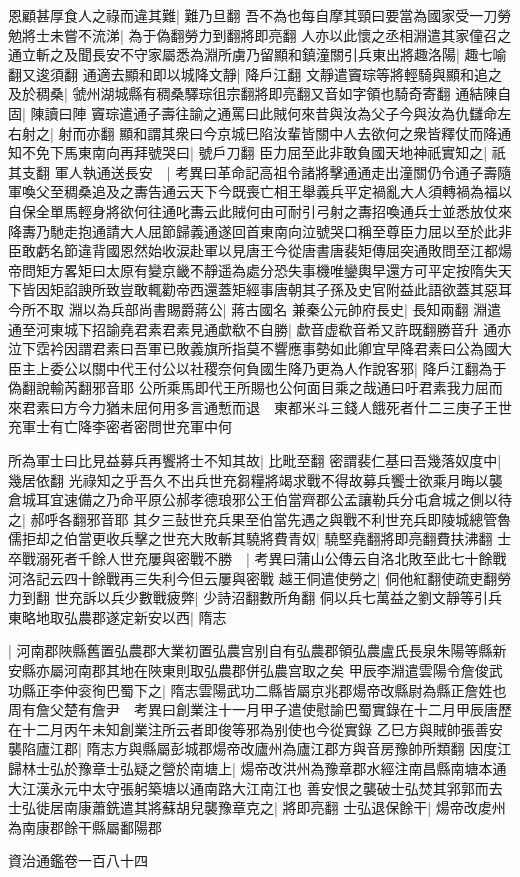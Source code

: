 恩顧甚厚食人之祿而違其難|{
	難乃旦翻}
吾不為也每自摩其頸曰要當為國家受一刀勞勉將士未嘗不流涕|{
	為于偽翻勞力到翻將即亮翻}
人亦以此懷之丞相淵遣其家僮召之通立斬之及聞長安不守家屬悉為淵所虜乃留顯和鎮潼關引兵東出將趣洛陽|{
	趣七喻翻又逡須翻}
通適去顯和即以城降文靜|{
	降戶江翻}
文靜遣竇琮等將輕騎與顯和追之及於稠桑|{
	虢州湖城縣有稠桑驛琮徂宗翻將即亮翻又音如字領也騎奇寄翻}
通結陳自固|{
	陳讀曰陣}
竇琮遣通子壽往諭之通罵曰此賊何來昔與汝為父子今與汝為仇讎命左右射之|{
	射而亦翻}
顯和謂其衆曰今京城巳陷汝輩皆關中人去欲何之衆皆釋仗而降通知不免下馬東南向再拜號哭曰|{
	號戶刀翻}
臣力屈至此非敢負國天地神祇實知之|{
	祇其支翻}
軍人執通送長安　|{
	考異曰革命記高祖令諸將擊通通走出潼關仍令通子壽隨軍喚父至稠桑追及之夀告通云天下今既喪亡相王舉義兵平定禍亂大人須轉禍為福以自保全單馬輕身將欲何往通叱夀云此賊何由可耐引弓射之夀招喚通兵士並悉放仗來降夀乃馳走抱通請大人屈節歸義通遂回首東南向泣號哭口稱至尊臣力屈以至於此非臣敢虧名節違背國恩然始收涙赴軍以見唐王今從唐書唐裴矩傳屈突通敗問至江都煬帝問矩方畧矩曰太原有變京畿不靜遥為處分恐失事機唯鑾輿早還方可平定按隋失天下皆因矩諂諛所致豈敢輒勸帝西還蓋矩經事唐朝其子孫及史官附益此語欲蓋其惡耳今所不取}
淵以為兵部尚書賜爵蔣公|{
	蔣古國名}
兼秦公元帥府長史|{
	長知兩翻}
淵遣通至河東城下招諭堯君素君素見通歔欷不自勝|{
	歔音虚欷音希又許既翻勝音升}
通亦泣下霑衿因謂君素曰吾軍已敗義旗所指莫不響應事勢如此卿宜早降君素曰公為國大臣主上委公以關中代王付公以社稷奈何負國生降乃更為人作說客邪|{
	降戶江翻為于偽翻說輸芮翻邪音耶}
公所乘馬即代王所賜也公何面目乘之哉通曰吁君素我力屈而來君素曰方今力猶未屈何用多言通慙而退　東都米斗三錢人餓死者什二三庚子王世充軍士有亡降李密者密問世充軍中何

所為軍士曰比見益募兵再饗將士不知其故|{
	比毗至翻}
密謂裴仁基曰吾幾落奴度中|{
	幾居依翻}
光祿知之乎吾久不出兵世充芻糧將竭求戰不得故募兵饗士欲乘月晦以襲倉城耳宜速備之乃命平原公郝孝德琅邪公王伯當齊郡公孟讓勒兵分屯倉城之側以待之|{
	郝呼各翻邪音耶}
其夕三鼔世充兵果至伯當先遇之與戰不利世充兵即陵城總管魯儒拒却之伯當更收兵擊之世充大敗斬其驍將費青奴|{
	驍堅堯翻將即亮翻費扶沸翻}
士卒戰溺死者千餘人世充屢與密戰不勝　|{
	考異曰蒲山公傳云自洛北敗至此七十餘戰河洛記云四十餘戰再三失利今但云屢與密戰}
越王侗遣使勞之|{
	侗他紅翻使疏吏翻勞力到翻}
世充訴以兵少數戰疲弊|{
	少詩沼翻數所角翻}
侗以兵七萬益之劉文靜等引兵東略地取弘農郡遂定新安以西|{
	隋志}


|{
	河南郡陜縣舊置弘農郡大業初置弘農宫别自有弘農郡領弘農盧氏長泉朱陽等縣新安縣亦屬河南郡其地在陜東則取弘農郡併弘農宫取之矣}
甲辰李淵遣雲陽令詹俊武功縣正李仲衮徇巴蜀下之|{
	隋志雲陽武功二縣皆屬京兆郡煬帝改縣尉為縣正詹姓也周有詹父楚有詹尹　考異曰創業注十一月甲子遣使慰諭巴蜀實錄在十二月甲辰唐歷在十二月丙午未知創業注所云者即俊等邪為别使也今從實錄}
乙巳方與賊帥張善安襲陷廬江郡|{
	隋志方與縣屬彭城郡煬帝改廬州為廬江郡方與音房豫帥所類翻}
因度江歸林士弘於豫章士弘疑之營於南塘上|{
	煬帝改洪州為豫章郡水經注南昌縣南塘本通大江漢永元中太守張躬築塘以通南路大江南江也}
善安恨之襲破士弘焚其郛郭而去士弘徙居南康蕭銑遣其將蘇胡兒襲豫章克之|{
	將即亮翻}
士弘退保餘干|{
	煬帝改䖍州為南康郡餘干縣屬鄱陽郡}


資治通鑑卷一百八十四
